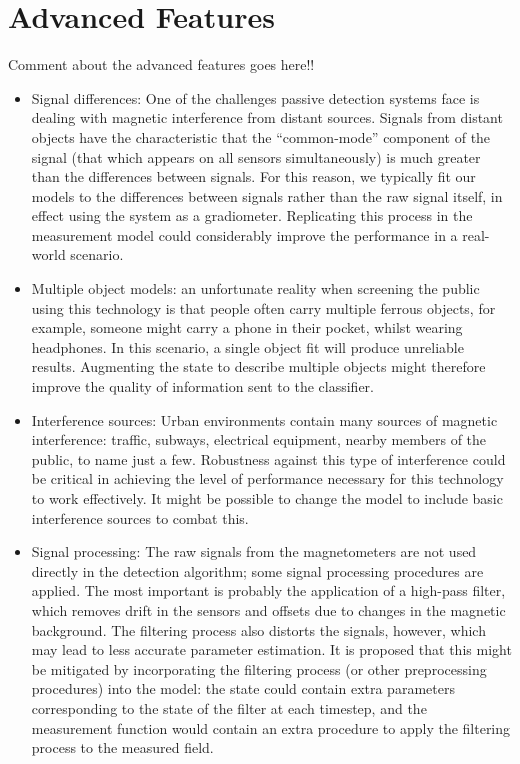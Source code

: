 \documentclass[10pt, a4paper, twocolumn]{article} %
\begin{document}
\section{Advanced Features}

Comment about the advanced features goes here!!

\begin{itemize}
	\item Signal differences: One of the challenges passive detection systems face is dealing with magnetic interference from distant sources. Signals from distant objects have the characteristic that the “common-mode” component of the signal (that which appears on all sensors simultaneously) is much greater than the differences between signals. For this reason, we typically fit our models to the differences between signals rather than the raw signal itself, in effect using the system as a gradiometer. Replicating this process in the measurement model could considerably improve the performance in a real-world scenario.
	
	\item Multiple object models: an unfortunate reality when screening the public using this technology is that people often carry multiple ferrous objects, for example, someone might carry a phone in their pocket, whilst wearing headphones. In this scenario, a single object fit will produce unreliable results. Augmenting the state to describe multiple objects might therefore improve the quality of information sent to the classifier.
	
	\item Interference sources: Urban environments contain many sources of magnetic interference: traffic, subways, electrical equipment, nearby members of the public, to name just a few. Robustness against this type of interference could be critical in achieving the level of performance necessary for this technology to work effectively. It might be possible to change the model to include basic interference sources to combat this.
	
	\item Signal processing: The raw signals from the magnetometers are not used directly in the detection algorithm; some signal processing procedures are applied. The most important is probably the application of a high-pass filter, which removes drift in the sensors and offsets due to changes in the magnetic background. The filtering process also distorts the signals, however, which may lead to less accurate parameter estimation. It is proposed that this might be mitigated by incorporating the filtering process (or other preprocessing procedures) into the model: the state could contain extra parameters corresponding to the state of the filter at each timestep, and the measurement function would contain an extra procedure to apply the filtering process to the measured field.
\end{itemize}
\end{document}
